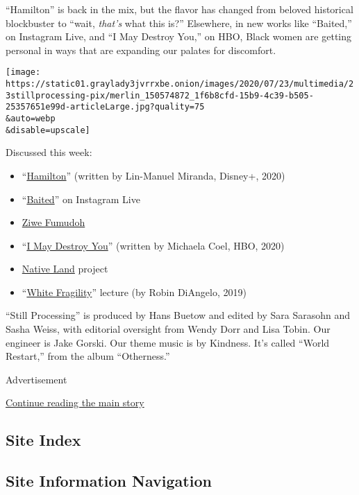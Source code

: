 ``Hamilton'' is back in the mix, but the flavor has changed from beloved
historical blockbuster to ``wait, \emph{that's} what this is?''
Elsewhere, in new works like ``Baited,'' on Instagram Live, and ``I May
Destroy You,'' on HBO, Black women are getting personal in ways that are
expanding our palates for discomfort.

\texttt{[image: https://static01.graylady3jvrrxbe.onion/images/2020/07/23/multimedia/23stillprocessing-pix/merlin\_150574872\_1f6b8cfd-15b9-4c39-b505-25357651e99d-articleLarge.jpg?quality=75\\\&auto=webp\\\&disable=upscale]}

Discussed this week:

\begin{itemize}
\item
  ``\href{https://disneyplusoriginals.disney.com/movie/hamilton}{Hamilton}''
  (written by Lin-Manuel Miranda, Disney+, 2020)
\item
  ``\href{https://www.instagram.com/ziwef/channel/?hl=en}{Baited}'' on
  Instagram Live
\item
  \href{https://ziwefumudoh.com/work}{Ziwe Fumudoh}
\item
  ``\href{https://www.hbo.com/i-may-destroy-you}{I May Destroy You}''
  (written by Michaela Coel, HBO, 2020)
\item
  \href{https://native-land.ca/}{Native Land} project
\item
  ``\href{https://www.youtube.com/watch?v=HrOFpaB-PQI}{White
  Fragility}'' lecture (by Robin DiAngelo, 2019)
\end{itemize}

``Still Processing'' is produced by Hans Buetow and edited by Sara
Sarasohn and Sasha Weiss, with editorial oversight from Wendy Dorr and
Lisa Tobin. Our engineer is Jake Gorski. Our theme music is by Kindness.
It's called ``World Restart,'' from the album ``Otherness.''

Advertisement

\protect\hyperlink{after-bottom}{Continue reading the main story}

\hypertarget{site-index}{%
\subsection{Site Index}\label{site-index}}

\hypertarget{site-information-navigation}{%
\subsection{Site Information
Navigation}\label{site-information-navigation}}

